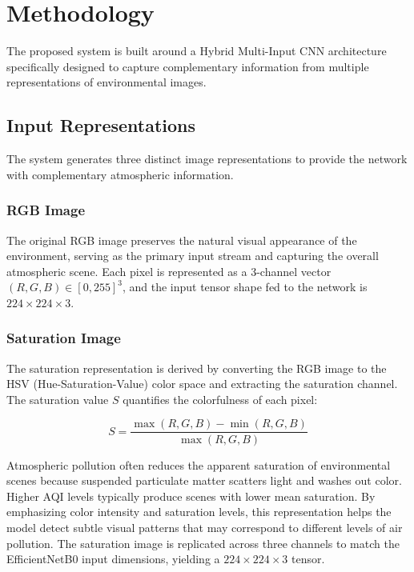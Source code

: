 \documentclass[conference]{IEEEtran}
\begin{document}
\section{Methodology}

The proposed system is built around a Hybrid Multi-Input CNN architecture
specifically designed to capture complementary information from multiple
representations of environmental images.

\subsection{Input Representations}

The system generates three distinct image representations to provide the
network with complementary atmospheric information.

\subsubsection{RGB Image}
The original RGB image preserves the natural visual appearance of the
environment, serving as the primary input stream and capturing the overall
atmospheric scene. Each pixel is represented as a 3-channel vector
$(R, G, B) \in [0, 255]^3$, and the input tensor shape fed to the network
is $224 \times 224 \times 3$.

\subsubsection{Saturation Image}
The saturation representation is derived by converting the RGB image to
the HSV (Hue-Saturation-Value) color space and extracting the saturation
channel. The saturation value $S$ quantifies the colorfulness of each pixel:

\begin{equation}
  S = \frac{\max(R,G,B) - \min(R,G,B)}{\max(R,G,B)}
\end{equation}

Atmospheric pollution often reduces the apparent saturation of environmental
scenes because suspended particulate matter scatters light and washes out
color. Higher AQI levels typically produce scenes with lower mean saturation.
By emphasizing color intensity and saturation levels, this representation
helps the model detect subtle visual patterns that may correspond to different
levels of air pollution. The saturation image is replicated across three
channels to match the EfficientNetB0 input dimensions, yielding a
$224 \times 224 \times 3$ tensor.
\end{document}
